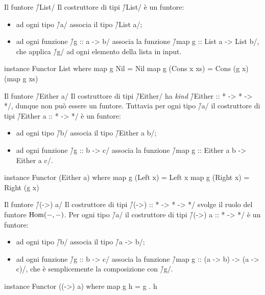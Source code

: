 \begin{frame}[fragile]{\secname}{Il funtore \h/List/}
Il costruttore di tipi \h/List/ è un funtore:
\begin{itemize}[<+(1)->]
\item ad ogni tipo \h/a/ associa il tipo \h/List a/;
\item ad ogni funzione \h/g :: a -> b/ associa la funzione \h/map g :: List a -> List b/, che applica \h/g/ ad ogni elemento della lista in input.
\end{itemize}
\pause

\begin{haskellcode}
instance Functor List where
    map g Nil = Nil
    map g (Cons x xs) = Cons (g x) (map g xs)
\end{haskellcode}
\end{frame}


\begin{frame}[fragile]{\secname}{Il funtore \h/Either a/}
Il costruttore di tipi \h/Either/ ha \emph{kind} \h/Either :: * -> * -> */, dunque non può essere un funtore. Tuttavia per ogni tipo \h/a/ il costruttore di tipi \h/Either a :: * -> */ è un funtore:

\begin{itemize}[<+(1)->]
\item ad ogni tipo \h/b/ associa il tipo \h/Either a b/;
\item ad ogni funzione \h/g :: b -> c/ associa la funzione \h/map g :: Either a b -> Either a c/.
\end{itemize}
\pause

\begin{haskellcode}
instance Functor (Either a) where
    map g (Left x) = Left x
    map g (Right x) = Right (g x)
\end{haskellcode}
\end{frame}


\begin{frame}[fragile]{\secname}{Il funtore \h/(->) a/}
Il costruttore di tipi \h/(->) :: * -> * -> */ svolge il ruolo del funtore $\operatorname{Hom}(-,-)$. Per ogni tipo \h/a/ il costruttore di tipi \h/(->) a :: * -> */ è un funtore:
\begin{itemize}[<+(1)->]
\item ad ogni tipo \h/b/ associa il tipo \h/a -> b/;
\item ad ogni funzione \h/g :: b -> c/ associa la funzione \h/map g :: (a -> b) -> (a -> c)/, che è semplicemente la composizione con \h/g/.
\end{itemize}
\pause

\begin{haskellcode}
instance Functor ((->) a) where
    map g h = g . h
\end{haskellcode}
\end{frame}